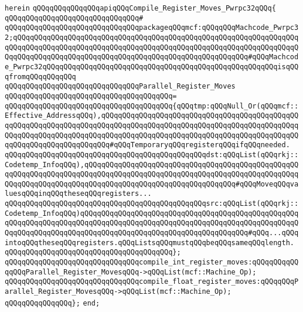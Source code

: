 \verb|herein|\newline
\newline
\verb|qQQqqQQqqQQqqQQqapiqQQqCompile_Register_Moves_Pwrpc32qQQq{|\newline
\verb|qQQqqQQqqQQqqQQqqQQqqQQqqQQqqQQq#|\newline
\verb|qQQqqQQqqQQqqQQqqQQqqQQqqQQqqQQqpackageqQQqmcf:qQQqqQQqMachcode_Pwrpc32;qQQqqQQqqQQqqQQqqQQqqQQqqQQqqQQqqQQqqQQqqQQqqQQqqQQqqQQqqQQqqQQqqQQqqQQqqQQqqQQqqQQqqQQqqQQqqQQqqQQqqQQqqQQqqQQqqQQqqQQqqQQqqQQqqQQqqQQqqQQqqQQqqQQqqQQqqQQqqQQqqQQqqQQqqQQqqQQqqQQqqQQqqQQqqQQqqQQq#qQQqMachcode_Pwrpc32qQQqqQQqqQQqqQQqqQQqqQQqqQQqqQQqqQQqqQQqqQQqqQQqqQQqqQQqisqQQqfromqQQqqQQqqQQq|\newline
\newline
\verb|qQQqqQQqqQQqqQQqqQQqqQQqqQQqqQQqParallel_Register_Moves|\newline
\verb|qQQqqQQqqQQqqQQqqQQqqQQqqQQqqQQqqQQqqQQq=|\newline
\verb|qQQqqQQqqQQqqQQqqQQqqQQqqQQqqQQqqQQqqQQq{qQQqtmp:qQQqNull_Or(qQQqmcf::Effective_AddressqQQq),qQQqqQQqqQQqqQQqqQQqqQQqqQQqqQQqqQQqqQQqqQQqqQQqqQQqqQQqqQQqqQQqqQQqqQQqqQQqqQQqqQQqqQQqqQQqqQQqqQQqqQQqqQQqqQQqqQQqqQQqqQQqqQQqqQQqqQQqqQQqqQQqqQQqqQQqqQQqqQQqqQQqqQQqqQQqqQQqqQQqqQQqqQQqqQQqqQQqqQQqqQQqqQQqqQQq#qQQqTemporaryqQQqregisterqQQqifqQQqneeded.|\newline
\verb|qQQqqQQqqQQqqQQqqQQqqQQqqQQqqQQqqQQqqQQqqQQqqQQqdst:qQQqList(qQQqrkj::Codetemp_InfoqQQq),qQQqqQQqqQQqqQQqqQQqqQQqqQQqqQQqqQQqqQQqqQQqqQQqqQQqqQQqqQQqqQQqqQQqqQQqqQQqqQQqqQQqqQQqqQQqqQQqqQQqqQQqqQQqqQQqqQQqqQQqqQQqqQQqqQQqqQQqqQQqqQQqqQQqqQQqqQQqqQQqqQQqqQQqqQQqqQQq#qQQqMoveqQQqvaluesqQQqinqQQqtheseqQQqregisters...|\newline
\verb|qQQqqQQqqQQqqQQqqQQqqQQqqQQqqQQqqQQqqQQqqQQqqQQqsrc:qQQqList(qQQqrkj::Codetemp_InfoqQQq)qQQqqQQqqQQqqQQqqQQqqQQqqQQqqQQqqQQqqQQqqQQqqQQqqQQqqQQqqQQqqQQqqQQqqQQqqQQqqQQqqQQqqQQqqQQqqQQqqQQqqQQqqQQqqQQqqQQqqQQqqQQqqQQqqQQqqQQqqQQqqQQqqQQqqQQqqQQqqQQqqQQqqQQqqQQqqQQqqQQq#qQQq...qQQqintoqQQqtheseqQQqregisters.qQQqListsqQQqmustqQQqbeqQQqsameqQQqlength.|\newline
\verb|qQQqqQQqqQQqqQQqqQQqqQQqqQQqqQQqqQQqqQQq};|\newline
\newline
\verb|qQQqqQQqqQQqqQQqqQQqqQQqqQQqqQQqcompile_int_register_moves:qQQqqQQqqQQqqQQqParallel_Register_MovesqQQq->qQQqList(mcf::Machine_Op);|\newline
\verb|qQQqqQQqqQQqqQQqqQQqqQQqqQQqqQQqcompile_float_register_moves:qQQqqQQqParallel_Register_MovesqQQq->qQQqList(mcf::Machine_Op);|\newline
\verb|qQQqqQQqqQQqqQQq};|\newline
\verb|end;|\newline

